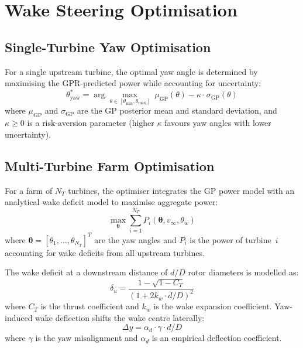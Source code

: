 \documentclass[12pt]{article}
\begin{document}
\section{Wake Steering Optimisation}
\label{sec:optimisation}

\subsection{Single-Turbine Yaw Optimisation}

For a single upstream turbine, the optimal yaw angle is determined by maximising the GPR-predicted power while accounting for uncertainty:
\begin{equation}
    \theta_{\text{yaw}}^* = \arg\max_{\theta \in [\theta_{\min}, \theta_{\max}]} \; \mu_{\text{GP}}(\theta) - \kappa \cdot \sigma_{\text{GP}}(\theta)
\end{equation}
where $\mu_{\text{GP}}$ and $\sigma_{\text{GP}}$ are the GP posterior mean and standard deviation, and $\kappa \geq 0$ is a risk-aversion parameter (higher $\kappa$ favours yaw angles with lower uncertainty).

\subsection{Multi-Turbine Farm Optimisation}

For a farm of $N_T$ turbines, the optimiser integrates the GP power model with an analytical wake deficit model to maximise aggregate power:
\begin{equation}
    \max_{\boldsymbol{\theta}} \sum_{i=1}^{N_T} P_i(\boldsymbol{\theta}, v_\infty, \theta_w)
\end{equation}
where $\boldsymbol{\theta} = [\theta_1, \ldots, \theta_{N_T}]^T$ are the yaw angles and $P_i$ is the power of turbine~$i$ accounting for wake deficits from all upstream turbines.

The wake deficit at a downstream distance of $d/D$ rotor diameters is modelled as:
\begin{equation}
    \delta_u = \frac{1 - \sqrt{1 - C_T}}{(1 + 2k_w \cdot d/D)^2}
\end{equation}
where $C_T$ is the thrust coefficient and $k_w$ is the wake expansion coefficient.
Yaw-induced wake deflection shifts the wake centre laterally:
\begin{equation}
    \Delta y = \alpha_d \cdot \gamma \cdot d/D
\end{equation}
where $\gamma$ is the yaw misalignment and $\alpha_d$ is an empirical deflection coefficient.
\end{document}
